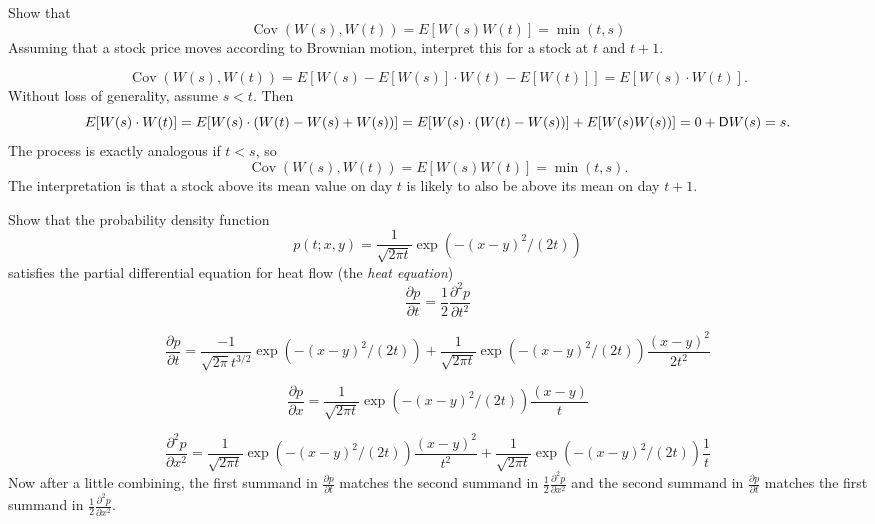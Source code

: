 \begin{problem}
 Show that
   \[
      \operatorname{Cov}(W(s),W(t)) = E[W(s) W(t)] = \min(t,s)
   \]
  Assuming that a stock price moves according to Brownian motion,
  interpret this for a stock at $ t $ and $ t+1 $.

\begin{sol}

\[
   \operatorname{Cov}(W(s),W(t)) = E[W(s) - E[W(s)] \cdot W(t) -
   E[W(t)]] = E[W(s) \cdot W(t)].
\]
Without loss of generality, assume $s < t$.  Then
\[
   E[W(s) \cdot W(t)] = E[ W(s) \cdot ( W(t) - W(s) + W(s))]
   = E[ W(s) \cdot ( W(t) - W(s)) ] + E[ W(s) W(s))] = 0 +
   \mathsf{D} W(s) = s.
\]
The process is exactly analogous if $t < s$, so
\[
   \operatorname{Cov}(W(s),W(t)) = E[W(s) W(t)] = \min(t,s).
\]
The interpretation is that a stock above its mean value on day $
t $ is likely to also be above its mean on day $ t + 1 $.
\end{sol}
\end{problem}

\begin{problem}
  Show that the probability density function
  \[
      p(t;x,y) = \frac{1}{\sqrt{2\pi t}} \exp( -(x-y)^2/(2t) )
  \]
  satisfies the partial differential equation for heat flow (the
  \emph{heat equation})
  \[
     \frac{\partial p}{\partial t} = \frac{1}{2} \frac{\partial^2
     p}{\partial t^2}
  \]


\begin{sol}
\[
   \frac{\partial p}{\partial t}
    = \frac{-1}{\sqrt{2\pi}  t^{3/2} } \exp( -(x-y)^2/(2t) )
    + \frac{1}{\sqrt{2\pi t}} \exp( -(x-y)^2/(2t) ) \frac{ (x-y)^2}{2 t^2}
\]

\[
   \frac{\partial p}{\partial x}
    = \frac{1}{\sqrt{2\pi t}} \exp( -(x-y)^2/(2t) ) \frac{ (x-y)}{t}
\]

\[
   \frac{\partial^2 p}{\partial x^2}
    = \frac{1}{\sqrt{2\pi t}} \exp( -(x-y)^2/(2t) ) \frac{
   (x-y)^2}{t^2}
   + \frac{1}{\sqrt{2\pi t}} \exp( -(x-y)^2/(2t) ) \frac{1}{t}
\]
Now after a little combining,
the first summand in  $ \frac{\partial p}{\partial t} $ matches
the second summand in $ \frac{1}{2}  \frac{\partial^2 p}{\partial x^2}$
and the second summand in  $ \frac{\partial p}{\partial t} $ matches
the first summand in $ \frac{1}{2}  \frac{\partial^2 p}{\partial x^2}$.
\end{sol}
\end{problem}

